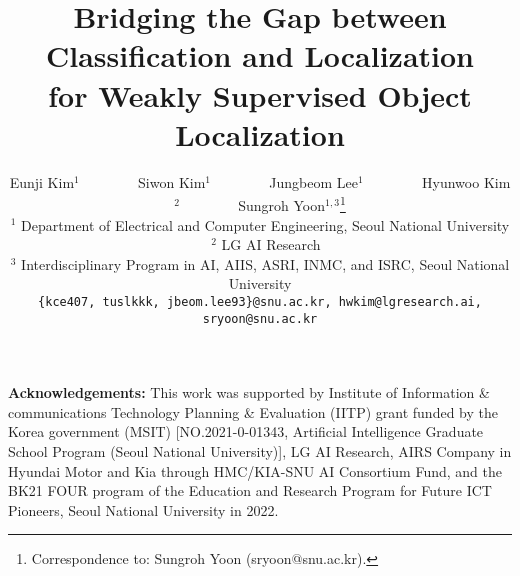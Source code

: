\documentclass[10pt,twocolumn,letterpaper]{article}
\begin{document}
\title{Bridging the Gap between Classification and Localization\\ for Weakly Supervised Object Localization}

\author{Eunji Kim$^1$ ~~~~~~~ Siwon Kim$^1$ ~~~~~~~  Jungbeom Lee$^1$  ~~~~~~~  Hyunwoo Kim$^2$  ~~~~~~~  Sungroh Yoon$^{1, 3}$\thanks{Correspondence to: Sungroh Yoon (sryoon@snu.ac.kr).}\\
$^1$ Department of Electrical and Computer Engineering, Seoul National University ~
$^2$ LG AI Research\\
$^3$ Interdisciplinary Program in AI, AIIS, ASRI, INMC, and ISRC, Seoul National University\\
{\tt\small \{kce407, tuslkkk, jbeom.lee93\}@snu.ac.kr, hwkim@lgresearch.ai, sryoon@snu.ac.kr}}
\maketitle

\newcommand{\xmark}{\text{\ding{55}}}
\newcommand{\cmark}{\text{\ding{51}}}









\bigskip
\vspace{-1pt}
\noindent\textbf{Acknowledgements:}
This work was supported by Institute of Information \& communications Technology Planning \& Evaluation (IITP) grant funded by the Korea government (MSIT) [NO.2021-0-01343, Artificial Intelligence Graduate School Program (Seoul National University)], LG AI Research, AIRS Company in Hyundai Motor and Kia through HMC/KIA-SNU AI Consortium Fund, and the BK21 FOUR program of the Education and Research Program for Future ICT Pioneers, Seoul National University in 2022.

{\small


}


\clearpage
{}

\setcounter{section}{0}
\renewcommand\thesection{\Alph{section}}
\setcounter{table}{0}
\renewcommand{\thetable}{A\arabic{table}}
\setcounter{figure}{0}
\renewcommand{\thefigure}{A\arabic{figure}}


\end{document}
